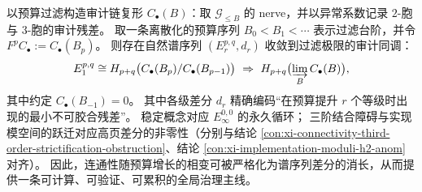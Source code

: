 \begin{conclusion}\label{con:xi-budget-anom-spectral-sequence}
以预算过滤构造审计链复形 \(C_\bullet(B)\)：取 \(\mathcal{G}_{\le B}\) 的 nerve，并以异常系数记录 \(2\)-胞与 \(3\)-胞的审计残差。
取一条离散化的预算序列 \(B_0<B_1<\cdots\) 表示过滤台阶，并令 \(F^{p}C_\bullet:=C_\bullet(B_p)\)。
则存在自然谱序列 \((E_r^{p,q},d_r)\) 收敛到过滤极限的审计同调：
\[
E_1^{p,q}\cong H_{p+q}\bigl(C_\bullet(B_{p})/C_\bullet(B_{p-1})\bigr)
\ \Rightarrow\ 
H_{p+q}\bigl(\varinjlim_B C_\bullet(B)\bigr),
\]
其中约定 \(C_\bullet(B_{-1})=0\)。
其中各级差分 \(d_r\) 精确编码“在预算提升 \(r\) 个等级时出现的最小不可胶合残差”。
稳定概念对应 \(E_\infty^{0,0}\) 的永久循环；
三阶结合障碍与实现模空间的跃迁对应高页差分的非零性（分别与结论 \ref{con:xi-connectivity-third-order-strictification-obstruction}、结论 \ref{con:xi-implementation-moduli-h2-anom} 对齐）。
因此，连通性随预算增长的相变可被严格化为谱序列差分的消长，从而提供一条可计算、可验证、可累积的全局治理主线。
\end{conclusion}

